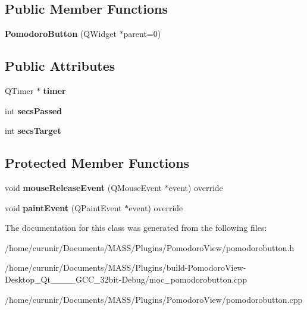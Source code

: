 \subsection*{Public Member Functions}
\begin{DoxyCompactItemize}
\item 
{\bfseries Pomodoro\+Button} (Q\+Widget $\ast$parent=0)\hypertarget{class_pomodoro_button_af566cac51b9c2ddba1b26ced5ed01de1}{}\label{class_pomodoro_button_af566cac51b9c2ddba1b26ced5ed01de1}

\end{DoxyCompactItemize}
\subsection*{Public Attributes}
\begin{DoxyCompactItemize}
\item 
Q\+Timer $\ast$ {\bfseries timer}\hypertarget{class_pomodoro_button_ab42338e4ce1e5d0f8acbe73565177e41}{}\label{class_pomodoro_button_ab42338e4ce1e5d0f8acbe73565177e41}

\item 
int {\bfseries secs\+Passed}\hypertarget{class_pomodoro_button_a6587b4babb2f78e4ee99de6c3bfd2e48}{}\label{class_pomodoro_button_a6587b4babb2f78e4ee99de6c3bfd2e48}

\item 
int {\bfseries secs\+Target}\hypertarget{class_pomodoro_button_a32cc630ba2b255bda7dfaf0b7209b79b}{}\label{class_pomodoro_button_a32cc630ba2b255bda7dfaf0b7209b79b}

\end{DoxyCompactItemize}
\subsection*{Protected Member Functions}
\begin{DoxyCompactItemize}
\item 
void {\bfseries mouse\+Release\+Event} (Q\+Mouse\+Event $\ast$event) override\hypertarget{class_pomodoro_button_a75802646c43d4f9ffd4d7e5b4c20be8b}{}\label{class_pomodoro_button_a75802646c43d4f9ffd4d7e5b4c20be8b}

\item 
void {\bfseries paint\+Event} (Q\+Paint\+Event $\ast$event) override\hypertarget{class_pomodoro_button_afb688dd2937945dd444a63999ef69ece}{}\label{class_pomodoro_button_afb688dd2937945dd444a63999ef69ece}

\end{DoxyCompactItemize}


The documentation for this class was generated from the following files\+:\begin{DoxyCompactItemize}
\item 
/home/curunir/\+Documents/\+M\+A\+S\+S/\+Plugins/\+Pomodoro\+View/pomodorobutton.\+h\item 
/home/curunir/\+Documents/\+M\+A\+S\+S/\+Plugins/build-\/\+Pomodoro\+View-\/\+Desktop\+\_\+\+Qt\+\_\+\_\+\_\+\_\+\+G\+C\+C\+\_\+32bit-\/\+Debug/moc\+\_\+pomodorobutton.\+cpp\item 
/home/curunir/\+Documents/\+M\+A\+S\+S/\+Plugins/\+Pomodoro\+View/pomodorobutton.\+cpp\end{DoxyCompactItemize}
